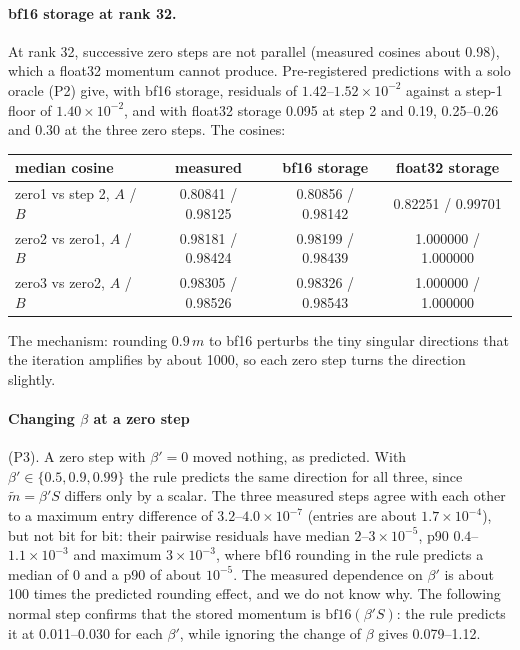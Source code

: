 \documentclass[11pt]{article}
\newcommand{\bfs}{\mathrm{bf16}}
\begin{document}
\paragraph{bf16 storage at rank 32.} At rank 32, successive zero steps are not parallel (measured
cosines about 0.98), which a float32 momentum cannot produce. Pre-registered predictions with a solo
oracle (P2) give, with bf16 storage, residuals of $1.42$--$1.52\times10^{-2}$ against a step-1 floor
of $1.40\times10^{-2}$, and with float32 storage 0.095 at step 2 and 0.19, 0.25--0.26 and 0.30 at the
three zero steps. The cosines:
\begin{center}\small
\begin{tabular}{lccc}\toprule
median cosine & measured & bf16 storage & float32 storage\\\midrule
zero1 vs step 2, $A$ / $B$ & 0.80841 / 0.98125 & 0.80856 / 0.98142 & 0.82251 / 0.99701\\
zero2 vs zero1, $A$ / $B$ & 0.98181 / 0.98424 & 0.98199 / 0.98439 & 1.000000 / 1.000000\\
zero3 vs zero2, $A$ / $B$ & 0.98305 / 0.98526 & 0.98326 / 0.98543 & 1.000000 / 1.000000\\\bottomrule
\end{tabular}
\end{center}
The mechanism: rounding $0.9\,m$ to bf16 perturbs the tiny singular directions that the iteration
amplifies by about 1000, so each zero step turns the direction slightly.

\paragraph{Changing $\beta$ at a zero step} (P3). A zero step with $\beta'=0$ moved nothing, as
predicted. With $\beta'\in\{0.5,0.9,0.99\}$ the rule predicts the same direction for all three,
since $\tilde m=\beta'S$ differs only by a scalar. The three measured steps agree with each other
to a maximum entry difference of $3.2$--$4.0\times10^{-7}$ (entries are about $1.7\times10^{-4}$), but
not bit for bit: their pairwise residuals have median $2$--$3\times10^{-5}$, p90 $0.4$--$1.1\times10^{-3}$
and maximum $3\times10^{-3}$, where bf16 rounding in the rule predicts a median of 0 and a p90 of
about $10^{-5}$. The measured dependence on $\beta'$ is about 100 times the predicted rounding effect,
and we do not know why. The following normal step confirms that the stored momentum is
$\bfs(\beta'S)$: the rule predicts it at 0.011--0.030 for each $\beta'$, while ignoring the change of
$\beta$ gives 0.079--1.12.
\end{document}
